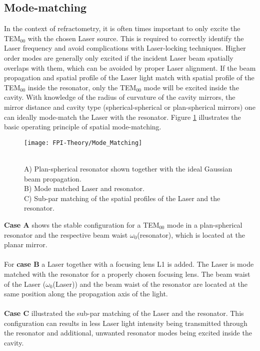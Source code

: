 \subsection{Mode-matching}
In the context of refractometry, it is often times important to only excite the TEM$_{00}$ with the chosen Laser source. This is required to correctly identify the Laser frequency and avoid complications with Laser-locking techniques. 
Higher order modes are generally only excited if the incident Laser beam spatially overlaps with them, which can be avoided by proper Laser alignment. If the beam propagation and spatial profile of the Laser light match with spatial profile of the TEM$_{00}$ inside the resonator, only the TEM$_{00}$ mode will be excited inside the cavity. With knowledge of the radius of curvature of the cavity mirrors, the mirror distance and cavity type (spherical-spherical or plan-spherical mirrors) one can ideally mode-match the Laser with the resonator.
Figure \ref{figure:FPI_mode_matching} illustrates the basic operating principle of spatial mode-matching.
\begin{figure}[H] 
	\centering
	\texttt{[image: FPI-Theory/Mode\_Matching]}
	\caption{\\A) Plan-spherical resonator shown together with the ideal Gaussian beam propagation.\\
		B) Mode matched Laser and resonator.\\
		C) Sub-par matching of the spatial profiles of the Laser and the resonator.}
	\label{figure:FPI_mode_matching}
\end{figure}
\newpage
\noindent
\textbf{Case A} shows the stable configuration for a TEM$_{00}$ mode in a plan-spherical resonator and the respective beam waist $\omega_0$(resonator), which is located at the planar mirror.\\\\
For \textbf{case B} a Laser together with a focusing lens L1 is added. The Laser is mode matched with the resonator for a properly chosen focusing lens. The beam waist of the Laser ($\omega_0$(Laser)) and the beam waist of the resonator are located at the same position along the propagation axis of the light.\\\\
\textbf{Case C} illustrated the sub-par matching of the Laser and the resonator. This configuration can results in less Laser light intensity being transmitted through the resonator and additional, unwanted resonator modes being excited inside the cavity.\\\\
